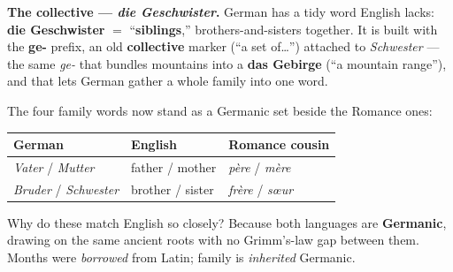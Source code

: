 \begin{morphologybox}
\textbf{The collective --- \emph{die Geschwister}.} German has a tidy word
English lacks: \textbf{die Geschwister} $=$ ``\textbf{siblings},''
brothers-and-sisters together. It is built with the \textbf{ge-} prefix, an old
\textbf{collective} marker (``a set of\ldots'') attached to \emph{Schwester} ---
the same \emph{ge-} that bundles mountains into a \textbf{das Gebirge} (``a
mountain range''), and that lets German gather a whole family into one word.
\end{morphologybox}

The four family words now stand as a Germanic set beside the Romance ones:

\begin{center}
\begin{tabular}{@{}lll@{}}
\toprule
German & English & Romance cousin \\
\midrule
\emph{Vater} / \emph{Mutter} & father / mother & \emph{p\`{e}re} / \emph{m\`{e}re} \\
\emph{Bruder} / \emph{Schwester} & brother / sister & \emph{fr\`{e}re} / \emph{s\oe{}ur} \\
\bottomrule
\end{tabular}
\end{center}

\begin{culture}
Why do these match English so closely? Because both languages are
\textbf{Germanic}, drawing on the same ancient roots with no Grimm's-law gap
between them. Months were \emph{borrowed} from Latin; family is
\emph{inherited} Germanic.
\end{culture}
